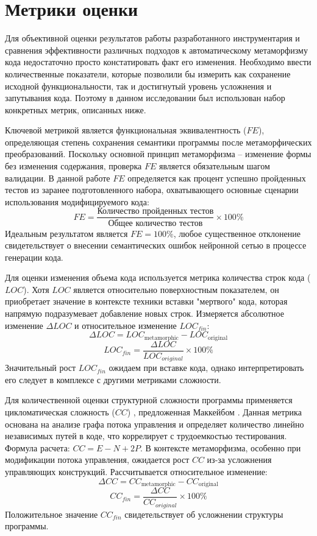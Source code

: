 \section{Метрики оценки}

Для объективной оценки результатов работы разработанного инструментария и сравнения эффективности различных подходов к автоматическому метаморфизму кода недостаточно просто констатировать факт его изменения. Необходимо ввести количественные показатели, которые позволили бы измерить как сохранение исходной функциональности, так и достигнутый уровень усложнения и запутывания кода. Поэтому в данном исследовании был использован набор конкретных метрик, описанных ниже.

Ключевой метрикой является функциональная эквивалентность ($FE$), определяющая степень сохранения семантики программы после метаморфических преобразований. Поскольку основной принцип метаморфизма – изменение формы без изменения содержания, проверка $FE$ является обязательным шагом валидации. В данной работе $FE$ определяется как процент успешно пройденных тестов из заранее подготовленного набора, охватывающего основные сценарии использования модифицируемого кода:
\[ FE = \frac{\text{Количество пройденных тестов}}{\text{Общее количество тестов}} \times 100\% \]
Идеальным результатом является $FE = 100\%$, любое существенное отклонение свидетельствует о внесении семантических ошибок нейронной сетью в процессе генерации кода.

Для оценки изменения объема кода используется метрика количества строк кода ($LOC$). Хотя $LOC$ является относительно поверхностным показателем, он приобретает значение в контексте техники вставки "мертвого" кода, которая напрямую подразумевает добавление новых строк. Измеряется абсолютное изменение $\Delta LOC$ и относительное изменение $LOC_{fin}$:
\[ \Delta LOC = LOC_{\text{metamorphic}} - LOC_{\text{original}} \]
\[ LOC_{fin} = \frac{\Delta LOC}{LOC_{original}} \times 100\% \]
Значительный рост $LOC_{fin}$ ожидаем при вставке кода, однако интерпретировать его следует в комплексе с другими метриками сложности.

Для количественной оценки структурной сложности программы применяется цикломатическая сложность ($CC$)  , предложенная Маккейбом \cite{McCabe76Complexity}. Данная метрика основана на анализе графа потока управления и определяет количество линейно независимых путей в коде, что коррелирует с трудоемкостью тестирования. Формула расчета: $CC = E - N + 2P$. В контексте метаморфизма, особенно при модификации потока управления, ожидается рост $CC$ из-за усложнения управляющих конструкций. Рассчитывается относительное изменение:
\[ \Delta CC = CC_{\text{metamorphic}} - CC_{\text{original}} \]
\[ CC_{fin} = \frac{\Delta CC}{CC_{original}} \times 100\% \]
Положительное значение $CC_{fin}$ свидетельствует об усложнении структуры программы.

